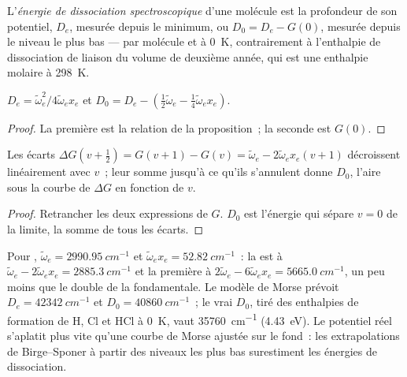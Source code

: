 \begin{definition}\label{def:b3:rovibrational-spectroscopy:dissociation}
L'\emph{énergie de dissociation spectroscopique}
d'une molécule est la profondeur de son potentiel, $D_e$, mesurée depuis
le minimum, ou $D_0 = D_e - G(0)$, mesurée depuis le niveau le plus bas
--- par molécule et à \qty{0}{K}, contrairement à l'enthalpie de
dissociation de liaison du volume de deuxième année, qui est une
enthalpie molaire à \qty{298}{K}.
\end{definition}

\begin{corollary}\label{cor:b3:rovibrational-spectroscopy:de}
$D_e = \tilde\omega_e^2/4\tilde\omega_ex_e$ et $D_0 = D_e - (\frac12\tilde\omega_e -
\frac14\tilde\omega_ex_e)$.
\end{corollary}

\begin{proof}
La première est la relation de la proposition~; la seconde est $G(0)$.
\end{proof}

\begin{proposition}\label{prop:b3:rovibrational-spectroscopy:birge-sponer}
Les écarts $\Delta G(v + \frac12) = G(v+1) - G(v) = \tilde\omega_e - 2\tilde\omega_ex_e(v +
1)$ décroissent linéairement avec $v$~; leur somme jusqu'à ce qu'ils
s'annulent donne $D_0$, l'aire sous la courbe de $\Delta G$ en fonction
de $v$.
\end{proposition}

\begin{proof}
Retrancher les deux expressions de $G$. $D_0$ est l'énergie qui sépare
$v = 0$ de la limite, la somme de tous les écarts.
\end{proof}

\begin{example}\label{ex:b3:rovibrational-spectroscopy:hcl}
Pour , $\tilde\omega_e = \qty{2990.95}{cm^{-1}}$ et $\tilde\omega_ex_e =
\qty{52.82}{cm^{-1}}$~: la  est à $\tilde\omega_e - 2\tilde\omega_ex_e =
\qty{2885.3}{cm^{-1}}$ et la première  à $2\tilde\omega_e - 6\tilde\omega_ex_e =
\qty{5665.0}{cm^{-1}}$, un peu moins que le double de la fondamentale. Le
modèle de Morse prévoit $D_e = \qty{42342}{cm^{-1}}$ et
$D_0 = \qty{40860}{cm^{-1}}$~; le vrai $D_0$,
tiré des enthalpies de formation de H, Cl et HCl à \qty{0}{K}, vaut
\qty{35760}{cm^{-1}} (\qty{4.43}{eV}). Le potentiel réel s'aplatit plus
vite qu'une courbe de Morse ajustée sur le fond~: les extrapolations de
Birge--Sponer à partir des niveaux les plus bas surestiment les énergies
de dissociation.
\end{example}

